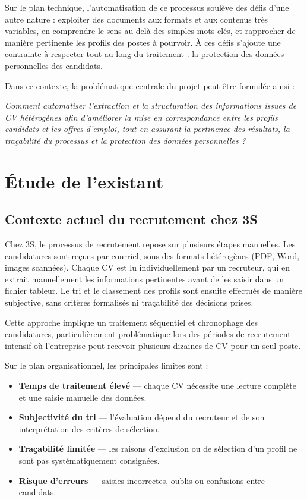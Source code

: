 \documentclass[12pt,a4paper]{report}
\begin{document}
Sur le plan technique, l'automatisation de ce processus soulève des défis d'une autre nature : exploiter des documents aux formats et aux contenus très variables, en comprendre le sens au-delà des simples mots-clés, et rapprocher de manière pertinente les profils des postes à pourvoir. À ces défis s'ajoute une contrainte à respecter tout au long du traitement : la protection des données personnelles des candidats.

Dans ce contexte, la problématique centrale du projet peut être formulée ainsi :

\begin{framed}
\noindent\textit{Comment automatiser l'extraction et la structuration des informations issues de CV hétérogènes afin d'améliorer la mise en correspondance entre les profils candidats et les offres d'emploi, tout en assurant la pertinence des résultats, la traçabilité du processus et la protection des données personnelles ?}
\end{framed}

\section{Étude de l'existant}

\subsection{Contexte actuel du recrutement chez 3S}

Chez 3S, le processus de recrutement repose sur plusieurs étapes manuelles. Les candidatures sont reçues par courriel, sous des formats hétérogènes (PDF, Word, images scannées). Chaque CV est lu individuellement par un recruteur, qui en extrait manuellement les informations pertinentes avant de les saisir dans un fichier tableur. Le tri et le classement des profils sont ensuite effectués de manière subjective, sans critères formalisés ni traçabilité des décisions prises.

Cette approche implique un traitement séquentiel et chronophage des candidatures, particulièrement problématique lors des périodes de recrutement intensif où l'entreprise peut recevoir plusieurs dizaines de CV pour un seul poste.

Sur le plan organisationnel, les principales limites sont :
\begin{itemize}
  \item \textbf{Temps de traitement élevé} — chaque CV nécessite une lecture complète et une saisie manuelle des données.
  \item \textbf{Subjectivité du tri} — l'évaluation dépend du recruteur et de son interprétation des critères de sélection.
  \item \textbf{Traçabilité limitée} — les raisons d'exclusion ou de sélection d'un profil ne sont pas systématiquement consignées.
  \item \textbf{Risque d'erreurs} — saisies incorrectes, oublis ou confusions entre candidats.
\end{itemize}
\end{document}

